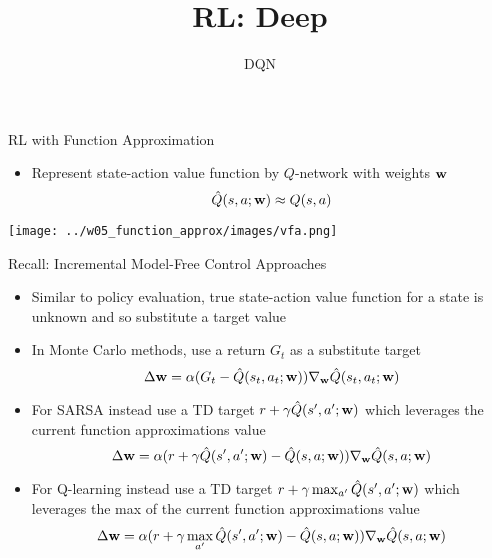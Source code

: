 \documentclass[aspectratio=169]{../latex_main/tntbeamer}  %
\title[RL: Deep Reinforcement Learning]{RL: Deep}
\subtitle{DQN}
\begin{document}
	
	\maketitle

\begin{frame}[c]{RL with Function Approximation}
	
\begin{itemize}
	\item Represent state-action value function by $Q$-network with weights $\mathbf{w}$
	$$\hat{Q}(s,a;\mathbf{w}) \approx Q(s,a)$$
\end{itemize}

\centering
\texttt{[image: ../w05\_function\_approx/images/vfa.png]}


\end{frame}
\begin{frame}[c]{Recall: Incremental Model-Free Control Approaches}
	
\begin{itemize}
	\item Similar to policy evaluation, true state-action value function for a state is unknown and so substitute a target value
	\item In Monte Carlo methods, use a return $G_t$ as a substitute target
	$$\Delta \mathbf{w} = \alpha(G_t - \hat{Q}(s_t,a_t; \mathbf{w})) \nabla_{\mathbf{w}} \hat{Q}(s_t, a_t; \mathbf{w}) $$
	\item For SARSA instead use a TD target $r+ \gamma \hat{Q}(s', a'; \mathbf{w})$ which leverages the current function approximations value
	$$\Delta \mathbf{w} = \alpha (r + \gamma \hat{Q}(s',a';\mathbf{w}) - \hat{Q}(s,a;\mathbf{w})) \nabla_{\mathbf{w}}\hat{Q}(s,a;\mathbf{w}) $$
	\item For Q-learning instead use a TD target $r + \gamma \max_{a'} \hat{Q}(s',a';\mathbf{w})$ which leverages the max of the current function approximations value
	$$\Delta \mathbf{w} = \alpha (r + \gamma \max_{a'} \hat{Q}(s',a';\mathbf{w}) - \hat{Q}(s,a;\mathbf{w})) \nabla_{\mathbf{w}}\hat{Q}(s,a;\mathbf{w}) $$
\end{itemize}
	
\end{frame}
\end{document}
